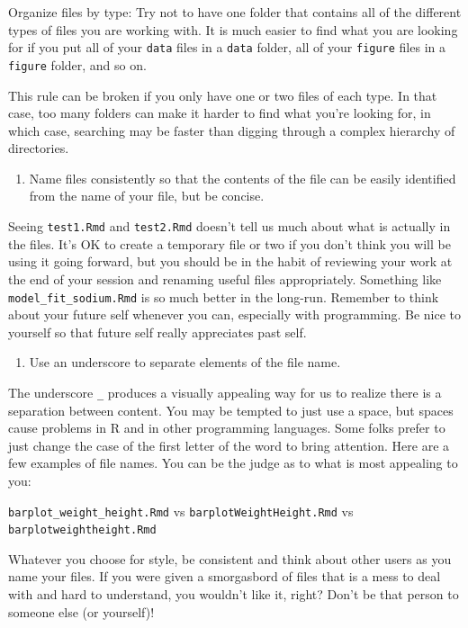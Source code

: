 \documentclass[]{tufte-book}
\providecommand{\tightlist}{%
  \setlength{\itemsep}{0pt}\setlength{\parskip}{0pt}}
\begin{document}
Organize files by type: Try not to have one folder that contains all of the
different types of files you are working with. It is much easier to find what you
are looking for if you put all of your \texttt{data} files in a \texttt{data} folder, all of
your \texttt{figure} files in a \texttt{figure} folder, and so on.

This rule can be broken if you only have one or two files of each type. In that
case, too many folders can make it harder to find what you're looking for, in which
case, searching may be faster than digging through a complex hierarchy of directories.

\begin{enumerate}
\def\labelenumi{\arabic{enumi}.}
\setcounter{enumi}{1}
\tightlist
\item
  Name files consistently so that the contents of the file can be easily
  identified from the name of your file, but be concise.
\end{enumerate}

Seeing \texttt{test1.Rmd} and \texttt{test2.Rmd} doesn't tell us much about what is actually
in the files. It's OK to create a temporary file or two if you don't think you
will be using it going forward, but you should be in the habit of reviewing your
work at the end of your session and renaming useful files appropriately.
Something like \texttt{model\_fit\_sodium.Rmd} is so much better in the long-run.
Remember to think about your future self whenever you can, especially with
programming. Be nice to yourself so that future self really appreciates past self.

\begin{enumerate}
\def\labelenumi{\arabic{enumi}.}
\setcounter{enumi}{2}
\tightlist
\item
  Use an underscore to separate elements of the file name.
\end{enumerate}

The underscore \texttt{\_} produces a visually appealing way for us to realize there is
a separation between content. You may be tempted to just use a space, but spaces
cause problems in R and in other programming languages. Some folks prefer to just
change the case of the first letter of the word to bring attention. Here are a few
examples of file names. You can be the judge as to what is most appealing to you:

\texttt{barplot\_weight\_height.Rmd} vs \texttt{barplotWeightHeight.Rmd} vs \texttt{barplotweightheight.Rmd}

Whatever you choose for style, be consistent and think about other users as you
name your files. If you were given a smorgasbord of files that is a mess to
deal with and hard to understand, you wouldn't like it, right? Don't be that
person to someone else (or yourself)!
\end{document}
